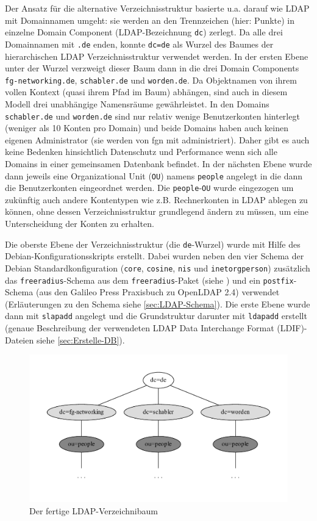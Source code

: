 \documentclass[11pt,a4paper,titlepage=firstiscover,headsepline,bibtotoc]{scrartcl} %
\begin{document}
Der Ansatz für die alternative Verzeichnisstruktur basierte u.a. darauf wie LDAP mit Domainnamen umgeht: sie werden an den Trennzeichen (hier: Punkte) in einzelne Domain Component (LDAP-Bezeichnung \texttt{dc}) zerlegt. Da alle drei Domainnamen mit \texttt{.de} enden, konnte \texttt{dc=de} als Wurzel des Baumes der hierarchischen LDAP Verzeichnisstruktur verwendet werden. In der ersten Ebene unter der Wurzel verzweigt dieser Baum dann in die drei Domain Components  \texttt{fg-networking.de}, \texttt{schabler.de} und \texttt{worden.de}. Da Objektnamen von ihrem vollen Kontext (quasi ihrem Pfad im Baum) abhängen, sind auch in diesem Modell drei unabhängige Namensräume gewährleistet. In den Domains \texttt{schabler.de} und \texttt{worden.de} sind nur relativ wenige Benutzerkonten hinterlegt (weniger als 10 Konten pro Domain) und beide Domains haben auch keinen eigenen Administrator (sie werden von fgn mit administriert). Daher gibt es auch keine Bedenken hinsichtlich Datenschutz und Performance wenn sich alle Domains in einer gemeinsamen Datenbank befindet. In der nächsten Ebene wurde dann jeweils eine Organizational Unit (\texttt{OU}) namens \texttt{people} angelegt in die dann die Benutzerkonten eingeordnet werden. Die \texttt{people}-\texttt{OU} wurde eingezogen um zukünftig auch andere Kontentypen wie z.B. Rechnerkonten in LDAP ablegen zu können, ohne dessen Verzeichnisstruktur grundlegend ändern zu müssen, um eine Unterscheidung der Konten zu erhalten.

Die oberste Ebene der Verzeichnisstruktur (die \texttt{de}-Wurzel) wurde mit Hilfe des Debian-Konfigurationsskripts erstellt. Dabei wurden neben den vier Schema der Debian Standardkonfiguration (\texttt{core}, \texttt{cosine}, \texttt{nis} und \texttt{inetorgperson}) zusätzlich das \texttt{freeradius}-Schema aus dem \texttt{freeradius}-Paket (siehe ) und ein \texttt{postfix}-Schema (aus den Galileo Press Praxisbuch zu OpenLDAP 2.4) verwendet (Erläuterungen zu den Schema siehe \autoref{sec:LDAP-Schema}). Die erste Ebene wurde dann mit \texttt{slapadd} angelegt und die Grundstruktur darunter mit \texttt{ldapadd} erstellt (genaue Beschreibung der verwendeten LDAP Data Interchange Format (LDIF)-Dateien siehe \autoref{sec:Erstelle-DB}).

\begin{figure}[htbp] 
\centering
\includegraphics[width=\textwidth]{Bilder/LDAP-fgn.pdf}
\caption{Der fertige LDAP-Verzeichnibaum}
\label{fig:LDAP-Baum}
\end{figure}
\end{document}
